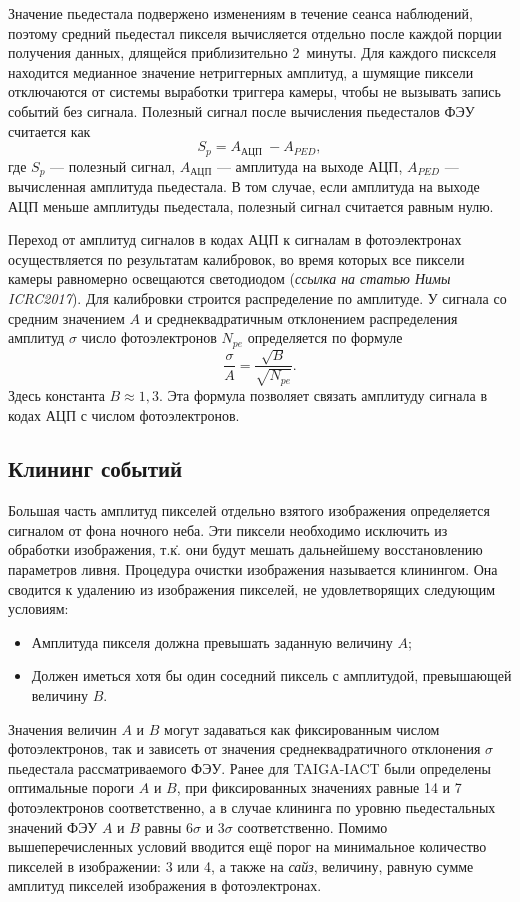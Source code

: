\documentclass[magd,floatypics,numeref]{msudipl} %
\begin{document}
Значение пьедестала подвержено изменениям в течение сеанса наблюдений, поэтому средний пьедестал пикселя вычисляется отдельно после каждой порции получения данных, длящейся приблизительно 2~минуты. Для каждого пискселя находится медианное значение нетриггерных амплитуд, а шумящие пиксели отключаются от системы выработки триггера камеры, чтобы не вызывать запись событий без сигнала. Полезный сигнал после вычисления пьедесталов ФЭУ считается как
\begin{equation}
S_{p}=A_{\text {АЦП }}-A_{P E D},
\end{equation}
где $S_p$ --- полезный сигнал, $A_{\text{АЦП}}$ --- амплитуда на выходе АЦП, $A_{PED}$ --- вычисленная амплитуда пьедестала. В том случае, если амплитуда на выходе АЦП меньше амплитуды пьедестала, полезный сигнал считается равным нулю.

Переход от амплитуд сигналов в кодах АЦП к сигналам в фотоэлектронах осуществляется  по результатам калибровок, во время которых все пиксели камеры равномерно освещаются светодиодом (\autocite{Lubsandorzhiev:2017oi}\textit{ссылка на статью Нимы ICRC2017}).  Для калибровки строится распределение по амплитуде. У сигнала со средним значением $A$ и среднеквадратичным отклонением распределения амплитуд $\sigma$ число фотоэлектронов $N_{pe}$ определяется по формуле
\begin{equation}
\frac{\sigma}{A}=\frac{\sqrt{B}}{\sqrt{N_{p e}}}.
\end{equation}
Здесь константа $B\approx1{,}3$. Эта формула позволяет связать амплитуду сигнала в кодах АЦП с числом фотоэлектронов.
\subsection{Клининг событий}
Большая часть амплитуд пикселей отдельно взятого изображения определяется сигналом от фона ночного неба. Эти пиксели необходимо исключить из обработки изображения, т.\.к. они будут мешать дальнейшему восстановлению параметров ливня. Процедура очистки изображения называется клинингом. Она сводится к удалению из изображения пикселей, не удовлетворящих следующим условиям:
\begin{itemize}
\item Амплитуда пикселя должна превышать заданную величину $A$;
\item Должен иметься хотя бы один соседний пиксель с амплитудой, превышающей величину $B$.
\end{itemize}

Значения величин $A$ и $B$ могут задаваться как фиксированным числом фотоэлектронов, так и зависеть от значения среднеквадратичного отклонения $\sigma$ пьедестала рассматриваемого ФЭУ. Ранее для TAIGA-IACT были определены оптимальные пороги $A$ и $B$, при фиксированных значениях равные 14 и 7 фотоэлектронов соответственно, а в случае клининга по уровню пьедестальных значений ФЭУ $A$ и $B$ равны $6\sigma$ и $3\sigma$ соответственно. Помимо вышеперечисленных условий вводится ещё порог на минимальное количество пикселей в изображении: 3 или 4, а также на \textit{сайз}, величину, равную сумме амплитуд пикселей изображения в фотоэлектронах.
\end{document}
